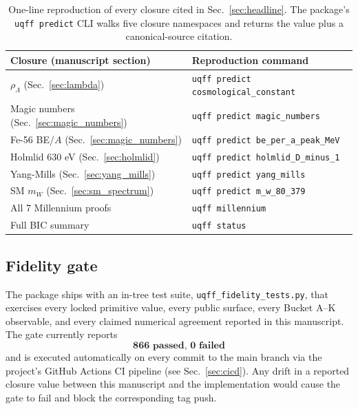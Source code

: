 \begin{table}[H]
\centering
\caption{One-line reproduction of every closure cited in
Sec.~\ref{sec:headline}. The package's \texttt{uqff predict} CLI
walks five closure namespaces and returns the value plus a
canonical-source citation.}
\label{tab:reproducibility_one_liners}
\begin{tabular}{l l}
\toprule
\textbf{Closure (manuscript section)} & \textbf{Reproduction command} \\
\midrule
$\rho_\Lambda$ (Sec.~\ref{sec:lambda}) & \texttt{uqff predict cosmological\_constant} \\
Magic numbers (Sec.~\ref{sec:magic_numbers}) & \texttt{uqff predict magic\_numbers} \\
Fe-56 BE/$A$ (Sec.~\ref{sec:magic_numbers}) & \texttt{uqff predict be\_per\_a\_peak\_MeV} \\
Holmlid 630 eV (Sec.~\ref{sec:holmlid}) & \texttt{uqff predict holmlid\_D\_minus\_1} \\
Yang-Mills (Sec.~\ref{sec:yang_mills}) & \texttt{uqff predict yang\_mills} \\
SM $m_W$ (Sec.~\ref{sec:sm_spectrum}) & \texttt{uqff predict m\_w\_80\_379} \\
All 7 Millennium proofs & \texttt{uqff millennium} \\
Full BIC summary & \texttt{uqff status} \\
\bottomrule
\end{tabular}
\end{table}

\subsection{Fidelity gate}
\label{sec:fidelity_gate}

The package ships with an in-tree test suite,
\texttt{uqff\_fidelity\_tests.py}, that exercises every locked
primitive value, every public surface, every Bucket A--K observable,
and every claimed numerical agreement reported in this manuscript.
The gate currently reports
\begin{equation}
\textbf{866 passed, 0 failed}
\label{eq:gate_state}
\end{equation}
and is executed automatically on every commit to the main branch via
the project's GitHub Actions CI pipeline (see Sec.~\ref{sec:cicd}).
Any drift in a reported closure value between this manuscript and
the implementation would cause the gate to fail and block the
corresponding tag push.

